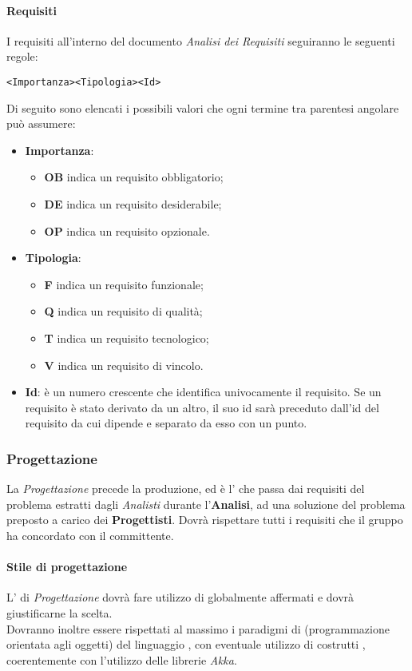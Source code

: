\documentclass{scalatekids-article}
\begin{document}
\paragraph{Requisiti}
\label{sec:adr}
I requisiti all'interno del documento \textit{Analisi dei Requisiti} seguiranno le seguenti regole:
\begin{center}
  \verb=<Importanza><Tipologia><Id>=
\end{center}
Di seguito sono elencati i possibili valori che ogni termine tra parentesi angolare può assumere:
\begin{itemize}
\item \textbf{Importanza}:
  \begin{itemize}
  \item \textbf{OB} indica un requisito obbligatorio;
  \item \textbf{DE} indica un requisito desiderabile;
  \item \textbf{OP} indica un requisito opzionale.
  \end{itemize}
\item \textbf{Tipologia}:
  \begin{itemize}
  \item \textbf{F} indica un requisito funzionale;
  \item \textbf{Q} indica un requisito di qualità;
  \item \textbf{T} indica un requisito tecnologico;
  \item \textbf{V} indica un requisito di vincolo.
  \end{itemize}
\item \textbf{Id}: è un numero crescente che identifica univocamente il requisito. Se un requisito è stato derivato da un altro, il suo id sarà preceduto dall'id del requisito da cui dipende e separato da esso con un punto.
\end{itemize}
\subsubsection{Progettazione}
La \textit{Progettazione} precede la produzione, ed è l' che
passa dai requisiti del problema estratti dagli \textit{Analisti} durante
l'\textbf{Analisi}, ad una soluzione del problema preposto a carico dei
\textbf{Progettisti}. Dovrà rispettare tutti i requisiti che il gruppo ha
concordato con il committente.
\paragraph{Stile di progettazione}
L' di \textit{Progettazione} dovrà fare utilizzo di
 globalmente affermati e dovrà giustificarne la
scelta.\\Dovranno inoltre essere rispettati al massimo i paradigmi di  (programmazione orientata agli oggetti) del linguaggio , con eventuale utilizzo
di costrutti , coerentemente con l'utilizzo delle librerie
\textit{Akka}.
\end{document}
